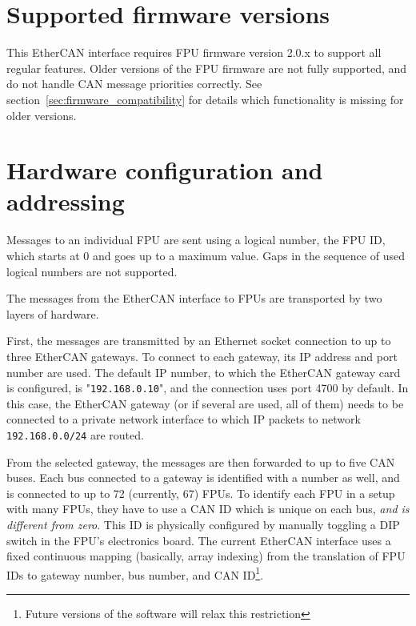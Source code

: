 \documentclass[fontsize=12,a4paper]{scrreprt}
\begin{document}
\section{Supported firmware versions}
This EtherCAN interface requires FPU firmware version 2.0.x to support
all regular features. Older versions of the FPU firmware are not fully
supported, and do not handle CAN message priorities correctly.  See
section~\ref{sec:firmware_compatibility} for details which
functionality is missing for older versions.

\section{Hardware configuration and addressing}
\label{sec:hardwareaddressing}
Messages to an individual FPU are sent using a logical number, the FPU
ID, which starts at 0 and goes up to a maximum value. Gaps in the
sequence of used logical numbers are not supported.

The messages from the EtherCAN interface to FPUs are transported by two layers of
hardware.

   First, the
messages are transmitted by an Ethernet socket connection to up to
three EtherCAN gateways. To connect to each gateway, its IP address
and port number are used. The default IP number, to which the EtherCAN
gateway card is configured, is "\texttt{192.168.0.10}", and the
connection uses port 4700 by default. In this case, the EtherCAN
gateway (or if several are used, all of them) needs to be connected to
a private network interface to which IP packets to network
\texttt{192.168.0.0/24} are routed.

From the selected gateway, the messages are then forwarded to up to
five CAN buses. Each bus connected to a gateway is identified with a
number as well, and is connected to up to 72 (currently, 67) FPUs.
 To identify each FPU in a setup with many FPUs,
they have to use a CAN ID which is unique on each bus, \emph{and is
  different from zero}. This ID is physically configured by manually
toggling a DIP switch in the FPU's electronics board. The current
EtherCAN interface uses a fixed continuous mapping (basically, array
indexing) from the translation of FPU IDs to gateway number, bus
number, and CAN ID\footnote{Future versions of the software will relax
  this restriction}.
\end{document}
